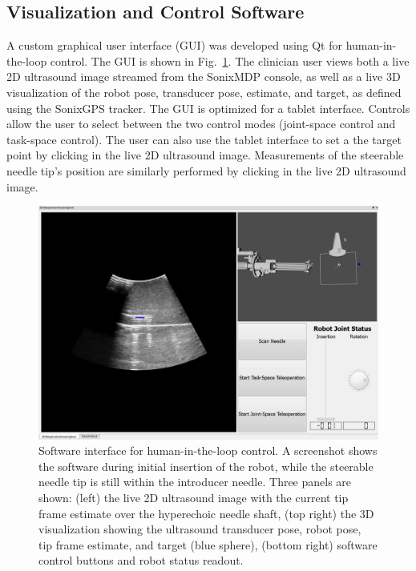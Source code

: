 \subsection{Visualization and Control Software}
A custom graphical user interface (GUI) was developed using Qt for human-in-the-loop control. The GUI is shown in Fig.~\ref{fig:GUI}. The clinician user views both a live 2D ultrasound image streamed from the SonixMDP console, as well as a live 3D visualization of the robot pose, transducer pose, estimate, and target, as defined using the SonixGPS tracker. The GUI is optimized for a tablet interface. Controls allow the user to select between the two control modes (joint-space control and task-space control). The user can also use the tablet interface to set a the target point by clicking in the live 2D ultrasound image. Measurements of the steerable needle tip's position are similarly performed by clicking in the live 2D ultrasound image. 

\begin{figure}[!t]
\centering
\includegraphics[width = 0.9\columnwidth]{./Images/Chapter5/GUI/GUI.jpg}%
\caption[Software interface]{Software interface for human-in-the-loop control. A screenshot shows the software during initial insertion of the robot, while the steerable needle tip is still within the introducer needle. Three panels are shown: (left) the live 2D ultrasound image with the current tip frame estimate over the hyperechoic needle shaft, (top right) the 3D visualization showing the ultrasound transducer pose, robot pose, tip frame estimate, and target (blue sphere), (bottom right) software control buttons and robot status readout.}
\label{fig:GUI}
\end{figure}  






